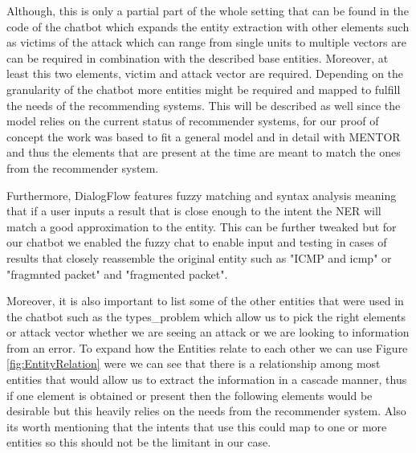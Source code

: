 Although, this is only a partial part of the whole setting that can be found in the code of the chatbot which expands the entity extraction with other elements such as victims of the attack which can range from single units to multiple vectors are can be required in combination with the described base entities. Moreover, at least this two elements, victim and attack vector are required. Depending on the granularity of the chatbot more entities might be required and mapped to fulfill the needs of the recommending systems. This will be described as well since the model relies on the current status of recommender systems, for our proof of concept the work was based to fit a general model and in detail with MENTOR \cite{MENTOR} and thus the elements that are present at the time are meant to match the ones from the recommender system.

Furthermore, DialogFlow features fuzzy matching and syntax analysis meaning that if a user inputs a result that is close enough to the intent the NER will match a good approximation to the entity. This can be further tweaked but for our chatbot we enabled the fuzzy chat to enable input and testing in cases of results that closely reassemble the original entity such as "ICMP and icmp" or "fragmnted packet" and "fragmented packet".

Moreover, it is also important to list some of the other entities that were used in the chatbot such as the types\_problem which allow us to pick the right elements or attack vector whether we are seeing an attack or we are looking to information from an error. To expand how the Entities relate to each other we can use Figure \ref{fig:EntityRelation} were we can see that there is a relationship among most entities that would allow us to extract the information in a cascade manner, thus if one element is obtained or present then the following elements would be desirable but this heavily relies on the needs from the recommender system. Also its worth mentioning that the intents that use this could map to one or more entities so this should not be the limitant in our case.  

